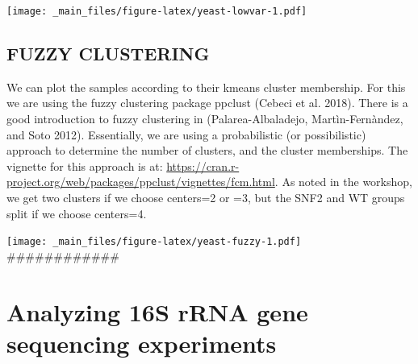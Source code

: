 \documentclass[onecolumn]{article}
\newenvironment{Shaded}{\begin{snugshade}}{\end{snugshade}}
\newcommand{\CommentTok}[1]{\textcolor[rgb]{0.56,0.35,0.01}{\textit{#1}}}
\newcommand{\DataTypeTok}[1]{\textcolor[rgb]{0.13,0.29,0.53}{#1}}
\newcommand{\DecValTok}[1]{\textcolor[rgb]{0.00,0.00,0.81}{#1}}
\newcommand{\KeywordTok}[1]{\textcolor[rgb]{0.13,0.29,0.53}{\textbf{#1}}}
\newcommand{\NormalTok}[1]{#1}
\newcommand{\OperatorTok}[1]{\textcolor[rgb]{0.81,0.36,0.00}{\textbf{#1}}}
\newcommand{\OtherTok}[1]{\textcolor[rgb]{0.56,0.35,0.01}{#1}}
\newcommand{\StringTok}[1]{\textcolor[rgb]{0.31,0.60,0.02}{#1}}
\begin{document}
\texttt{[image: \_main\_files/figure-latex/yeast-lowvar-1.pdf]}
\clearpage

\hypertarget{fuzzy-clustering}{%
\subsection{FUZZY CLUSTERING}\label{fuzzy-clustering}}

We can plot the samples according to their kmeans cluster membership. For this we are using the fuzzy clustering package ppclust (Cebeci et al. 2018). There is a good introduction to fuzzy clustering in (Palarea-Albaladejo, Martìn-Fernàndez, and Soto 2012). Essentially, we are using a probabilistic (or possibilistic) approach to determine the number of clusters, and the cluster memberships. The vignette for this approach is at: \url{https://cran.r-project.org/web/packages/ppclust/vignettes/fcm.html}. As noted in the workshop, we get two clusters if we choose centers=2 or =3, but the SNF2 and WT groups split if we choose centers=4.

\begin{Shaded}
\end{Shaded}

\texttt{[image: \_main\_files/figure-latex/yeast-fuzzy-1.pdf]}
\#\#\#\#\#\#\#\#\#\#\#\#

\hypertarget{analyzing-16s-rrna-gene-sequencing-experiments}{%
\section{Analyzing 16S rRNA gene sequencing experiments}\label{analyzing-16s-rrna-gene-sequencing-experiments}}
\end{document}
